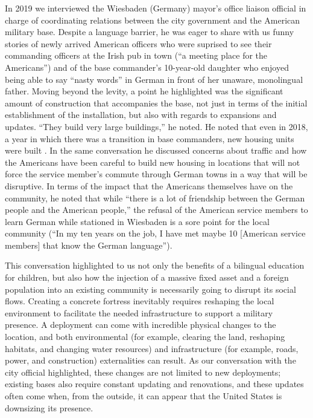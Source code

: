 {	In 2019 we interviewed the Wiesbaden (Germany) mayor's office liaison official in charge of coordinating relations between the city government and the American military base. Despite a language barrier, he was eager to share with us funny stories of newly arrived American officers who were suprised to see their commanding officers at the Irish pub in town (``a meeting place for the Americans'') and of the base commander's 10-year-old daughter who enjoyed being able to say ``nasty words'' in German in front of her unaware, monolingual father. Moving beyond the levity, a point he highlighted was the significant amount of construction that accompanies the base, not just in terms of the initial establishment of the installation, but also with regards to expansions and updates. ``They build very large buildings,'' he noted. He noted that even in 2018, a year in which there was a transition in base commanders, new housing units were built \cite{wiesbadenone20190725}. In the same conversation he discussed concerns about traffic and how the Americans have been careful to build new housing in locations that will not force the service member's commute through German towns in a way that will be disruptive. In terms of the impact that the Americans themselves have on the community, he noted that while ``there is a lot of friendship between the German people and the American people,'' the refusal of the American service members to learn German while stationed in Wiesbaden is a sore point for the local community (``In my ten years on the job, I have met maybe 10 [American service members] that know the German language'').

	
This conversation highlighted to us not only the benefits of a bilingual education for children, but also how the injection of a massive fixed asset and a foreign population into an existing community is necessarily going to disrupt its social flows. Creating a concrete fortress inevitably requires reshaping the local environment to facilitate the needed infrastructure to support a military presence. A deployment can come with incredible physical changes to the location, and both environmental (for example, clearing the land, reshaping habitats, and changing water resources) and infrastructure (for example, roads, power, and construction) externalities can result. As our conversation with the city official highlighted, these changes are not limited to new deployments; existing bases also require constant updating and renovations, and these updates often come when, from the outside, it can appear that the United States is downsizing its presence. 


}
